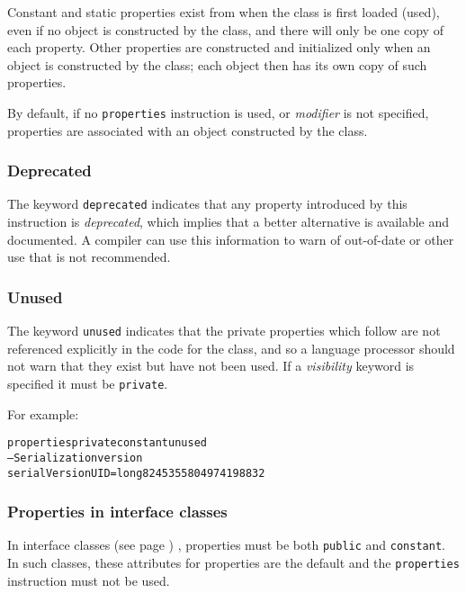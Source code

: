 Constant and static properties exist from when the class is first loaded
(used), even if no object is constructed by the class, and there will
only be one copy of each property.  Other properties are constructed and
initialized only when an object is constructed by the class; each object
then has its own copy of such properties.
 
By default, if no \texttt{properties} instruction is used, or
\emph{modifier} is not specified, properties are associated with an
object constructed by the class.
\subsubsection{Deprecated}\label{refdeppro}
 
The keyword \texttt{deprecated} indicates that any property introduced by
this instruction is \emph{deprecated}, which implies that a
better alternative is available and documented.  A compiler can
use this information to warn of out-of-date or other use that is
not recommended.
\subsubsection{Unused}\label{refunupro}
 
The keyword \texttt{unused} indicates that the private properties
which follow are not referenced explicitly in the code for the class,
and so a language processor should not warn that they exist but have not
been used.
If a \emph{visibility} keyword is specified it must be
\texttt{private}.
 
For example:
\begin{alltt}
properties private constant unused
  -- Serialization version
  serialVersionUID=long 8245355804974198832
\end{alltt}
\subsubsection{Properties in interface classes}
 
In  interface classes (see page \pageref{refinterf}) , properties must be both
\texttt{public} and \texttt{constant}.  In such classes, these
attributes for properties are the default and the \texttt{properties}
instruction must not be used.
